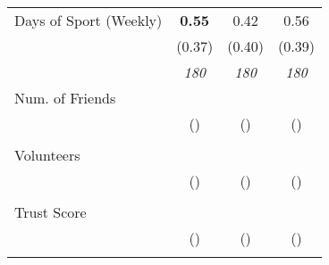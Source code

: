 \begin{tabular}{l c c c}
Days of Sport (Weekly) & \textbf{ 0.55 } & 0.42 & 0.56 \\
& (0.37) & (0.40) & (0.39) \\
& \textit{ 180 } & \textit{ 180 } & \textit{ 180 } \\
Num. of Friends & & & \\
& () & () & () \\
& & & \\
Volunteers & & & \\
& () & () & () \\
& & & \\
Trust Score & & & \\
& () & () & () \\
& & & \\
\bottomrule
\end{tabular}
